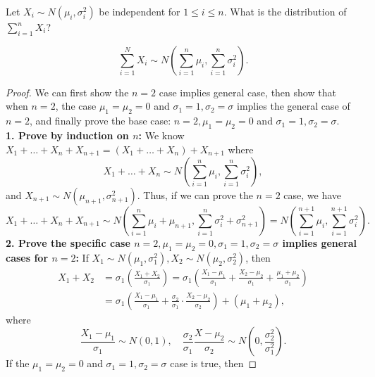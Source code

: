 \begin{question}
    Let \(X_i \sim N(\mu _i, \sigma _i^2)\) be independent for \(1 \le i \le n\). What is the distribution of \(\sum_{i=1}^n X_i \)?   
\end{question}

\begin{proposition}
    \[
        \sum_{i=1}^N X_i \sim N \left( \sum_{i=1}^n \mu_i, \sum_{i=1}^n \sigma _i^2   \right).  
    \]
\end{proposition}

\begin{proof}
    We can first show the \(n = 2\) case implies general case, then show that when \(n= 2\), the case \(\mu _1 = \mu _2 = 0\) and \(\sigma _1 = 1, \sigma _2 = \sigma \) implies the general case of \(n = 2\), and finally prove the base case: \(n = 2, \mu _1 = \mu _2 = 0\) and \(\sigma _1 = 1, \sigma _2 = \sigma\). \\
    \textbf{1. Prove by induction on \(n\):} We know \(X_1 + \dots + X_n + X_{{n+1}} = \left( X_1 + \dots + X_n \right) + X_{n+1} \) where 
    \[
        X_1 + \dots + X_n \sim N \left( \sum_{i=1}^n \mu _i, \sum_{i=1}^n \sigma _i^2   \right), 
    \]    
    and \(X_{n+1} \sim N(\mu _{n+1}, \sigma _{n+1}^2)\). Thus, if we can prove the \(n = 2\) case, we have 
    \[
        X_1 + \dots + X_n + X_{n+1} \sim N \left( \sum_{i=1}^n \mu _i + \mu _{n+1}, \sum_{i=1}^n \sigma _i^2 + \sigma_{n+1}^2   \right) = N \left( \sum_{i=1}^{n+1} \mu _i, \sum_{i=1}^{n+1} \sigma _i^2   \right).
    \]  
    \textbf{2. Prove the specific case \(n = 2, \mu _1 = \mu _2 = 0, \sigma _1 = 1, \sigma _2 = \sigma\) implies general cases for \(n=2\):} If \(X_1 \sim N (\mu _1, \sigma _1^2 ), X_2 \sim N(\mu _2, \sigma _2^2)\), then 
    \begin{align*}
        X_1 + X_2 &= \sigma _1 \left( \frac{X_1 + X_2}{\sigma _1} \right) = \sigma _1 \left( \frac{X_1 - \mu_1}{\sigma _1} + \frac{X_2 - \mu_2}{\sigma _1} + \frac{\mu _1 + \mu _2}{\sigma _1} \right) \\
        &= \sigma _1 \left( \frac{X_1 - \mu _1}{\sigma _1} + \frac{\sigma _2}{\sigma _1} \cdot \frac{X_2 - \mu _2}{\sigma _2} \right) + (\mu _1 + \mu _2),   
    \end{align*}  
    where 
    \[
        \frac{X_1 - \mu _1}{\sigma _1} \sim N(0, 1), \quad \frac{\sigma _2}{\sigma _1} \frac{X - \mu_2}{\sigma _2} \sim N \left( 0, \frac{\sigma _2 ^2}{\sigma _1 ^2} \right). 
    \]
    If the \(\mu _1 = \mu _2 = 0\) and \(\sigma _1 = 1, \sigma _2 = \sigma \) case is true, then 

\end{proof}
